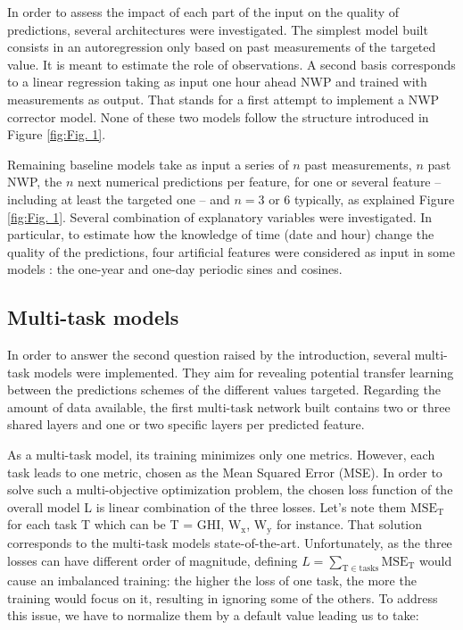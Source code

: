 \documentclass{article}
\newcommand{\saut}{\vspace{10px}}
\begin{document}
\saut

In order to assess the impact of each part of the input on the quality of predictions, several architectures were investigated.
The simplest model built consists in an autoregression only based on past measurements of the targeted value.
It is meant to estimate the role of observations. A second basis corresponds to a linear regression taking as input
one hour ahead NWP and trained with measurements as output. That stands for a first attempt to implement a
NWP corrector model. None of these two models follow the structure introduced in Figure \ref{fig:Fig. 1}.

\saut

Remaining baseline models take as input a series of $n$ past measurements, $n$ past NWP, the $n$ next
numerical predictions per feature, for one or several feature -- including at least the targeted one -- and $n = 3$ or
$6$ typically, as explained Figure \ref{fig:Fig. 1}. Several combination of explanatory variables were investigated.
In particular, to estimate how the knowledge of time (date and hour) change the quality of the predictions,
four artificial features were considered as input in some models : the one-year and one-day periodic sines and cosines.

\subsection*{Multi-task models}

In order to answer the second question raised by the introduction, several multi-task models were implemented.
They aim for revealing potential transfer learning between the predictions schemes of the different values targeted.
Regarding the amount of data available, the first multi-task network built contains two or three shared layers and
one or two specific layers per predicted feature.

\saut

As a multi-task model, its training minimizes only one metrics. However, each task leads to one metric, chosen as
the Mean Squared Error (MSE). In order to solve such a multi-objective optimization problem, the chosen loss
function of the overall model L is linear combination of the three losses. Let's note them
$\mathrm{MSE}_{\mathrm T}$
for each task T which can be T = GHI, $\mathrm W_{\mathrm x}$, $\mathrm W_{\mathrm y}$ for instance.
That solution corresponds to the multi-task models state-of-the-art.
Unfortunately, as the three losses can have different order of magnitude, defining
$L = \sum_{\mathrm T \in \mathrm{tasks}} \mathrm{MSE}_{\mathrm T}$ would cause an imbalanced training: the
higher the loss of one task, the more the training would focus on it, resulting in ignoring some of the others. To address
this issue, we have to normalize them by a default value leading us to take:
\end{document}
